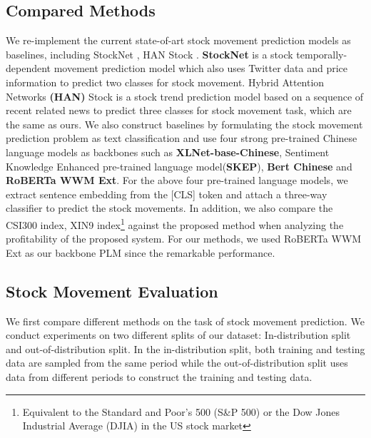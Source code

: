 \documentclass{article}
\begin{document}
\subsection{Compared Methods}
We re-implement the current state-of-art stock movement prediction models as baselines, including StockNet \cite{xu-cohen-2018-stock}, HAN Stock \cite{hu2018listening}. \textbf{StockNet} \cite{xu-cohen-2018-stock} is a stock temporally-dependent movement prediction model which also uses Twitter data and price information to predict two classes for stock movement. Hybrid Attention Networks \textbf{(HAN) }Stock \cite{hu2018listening} is a stock trend prediction model based on a sequence of recent related news to predict three classes for stock movement task, which are the same as ours. We also construct baselines by formulating the stock movement prediction problem as text classification and use four strong pre-trained Chinese language models as backbones such as \textbf{XLNet-base-Chinese}\cite{cui-etal-2020-revisiting}, Sentiment Knowledge Enhanced pre-trained language model(\textbf{SKEP})\cite{tian-etal-2020-skep}, \textbf{Bert Chinese}\cite{devlin-etal-2019-bert} and \textbf{RoBERTa WWM Ext}\cite{cui-etal-2020-revisiting}. For the above four pre-trained language models, we extract sentence embedding from the [CLS] token and attach a three-way classifier to predict the stock movements. In addition, we also compare the CSI300 index, XIN9 index\footnote{Equivalent to the Standard and Poor's 500 (S\&P 500) or the Dow Jones Industrial Average (DJIA) in the US stock market}
against the proposed method when analyzing the profitability of the proposed system. For our methods, we used RoBERTa WWM Ext as our backbone PLM since the remarkable performance.






















\subsection{Stock Movement Evaluation}
We first compare different methods on the task of stock movement prediction. We conduct experiments on two different splits of our dataset: In-distribution split and out-of-distribution split. In the in-distribution split, both training and testing data are sampled from the same period while the out-of-distribution split uses data from different periods to construct the training and testing data. \par
\end{document}
